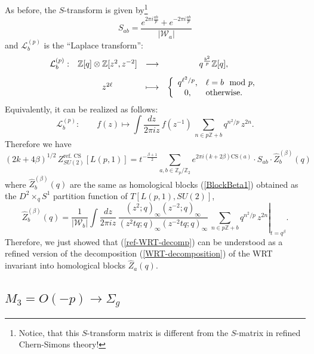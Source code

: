 \documentclass[hyper,letterpaper]{JHEP3}
\newcommand{\Z}{{\mathbb Z}}
\renewcommand{\hat}{\widehat}
\def\CL{{\mathcal L}}
\def\CW{{\mathcal W}}
\begin{document}
As before, the $S$-transform is given by\footnote{Notice, that this $S$-transform matrix is different from the $S$-matrix in refined Chern-Simons theory!}
\begin{equation}
	S_{ab}=\frac{e^{2\pi i\frac{ab}{p}}+e^{-2\pi i\frac{ab}{p}}}{|\CW_a|}
	\label{SZp}
\end{equation}
 and $\CL_{b}^{(p)}$ is the ``Laplace transform'':
\begin{equation}
	\begin{array}{cccc}
	\CL_{b}^{(p)}:& \Z[q]\otimes \Z[z^2,z^{-2}]&\longrightarrow & q^{\frac{b^2}{p}}\Z[q],
	\vspace{2ex}
	\\
	& z^{2\ell}&\longmapsto &
	\left\{\begin{array}{cl} q^{\ell^2/p}, & \ell=b \mod p, \\ 0, & \text{otherwise.}  \end{array}\right.
	\end{array}
	\label{LaplaceZp}
\end{equation}
Equivalently, it can be realized as follows:
\begin{equation}
	\CL_{b}^{(p)}:\qquad f(z) \longmapsto
	\int\frac{dz}{2\pi i z}\,
	f(z^{-1})\,\sum_{n\in p\Z+b}q^{n^2/p}\,z^{2n}.
\end{equation}
Therefore we have
\begin{equation}
	(2k+4\beta)^{1/2}\,Z_{SU(2)}^\text{ref. CS}[L(p,1)]
	=t^{-\frac{\beta+1}{2}}\sum_{a,b\in \Z_p /\Z_2} e^{2\pi i (k+2\beta)\text{CS}(a)}\cdot
	S_{ab}\cdot \hat{Z}_b^{(\beta)}(q)
	\label{ref-WRT-decomp}
\end{equation}
where $\hat{Z}^{(\beta)}_b(q)$ are the same as homological blocks (\ref{BlockBeta1}) obtained as the $D^2\times_q S^1$ partition function of $T[L(p,1),SU(2)]$,
\begin{equation}
	\hat{Z}^{(\beta)}_b(q)=
	\frac{1}{|\CW_b|}\left.\int\frac{dz}{2\pi i z}\,
	\frac{(z^2;q)_\infty(z^{-2};q)_\infty}{(z^2tq;q)_\infty(z^{-2}tq;q)_\infty}\,\sum_{n\in p\Z+b}q^{n^2/p}\,z^{2n}\right|_{t=q^\beta}.
\end{equation}
Therefore, we just showed that (\ref{ref-WRT-decomp}) can be understood as a refined version of the decomposition (\ref{WRT-decomposition}) of the WRT invariant into homological blocks $\hat{Z}_a(q)$.


\subsection{${M_3=O(-p)\rightarrow \Sigma_g}$}
\end{document}
